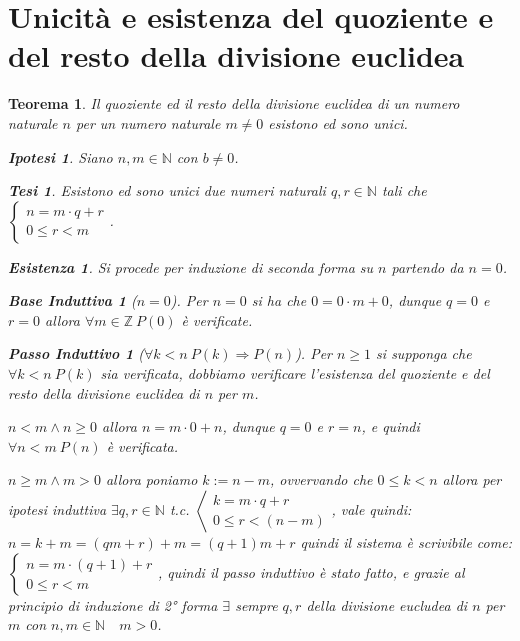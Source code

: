 \documentclass{article}
\makeatletter
\renewenvironment{proof}[1][\proofname]{\par
    \pushQED{\qed}%
    \normalfont \topsep6\p@\@plus6\p@\relax
    \trivlist
    \item\relax
    {\itshape
    #1\@addpunct{.}}\hspace\labelsep\ignorespaces
    }{%
    \popQED\endtrivlist\@endpefalse
}
\newtheorem{theorem}{Teorema}[part]
\newtheorem{ipothesis}[lemma]{Ipotesi}
\newtheorem{thesis}[lemma]{Tesi}
\theoremstyle{definition}
\newtheorem*{existence}{Esistenza}
\newtheorem*{base}{Base Induttiva}
\newtheorem*{step}{Passo Induttivo}
\newcommand{\N}{\mathbb{N}}
\makeatother
\begin{document}
\section{Unicità e esistenza del quoziente e del resto della divisione euclidea}
\begin{theorem}
    Il quoziente ed il resto della divisione euclidea di un numero naturale \(n\) per un numero naturale \(m\neq 0\) esistono ed sono unici.
    \begin{ipothesis}
        Siano \(n,m\in\mathbb{N}\) con \(b\neq 0\).
    \end{ipothesis}
    \begin{thesis}
        Esistono ed sono unici due numeri naturali \(q,r\in\mathbb{N}\) tali che \(\begin{cases} n=m\cdot q+r\\0\leq r<m\end{cases}\).
    \end{thesis}
    \begin{proof}
        \begin{existence}
            Si procede per induzione di seconda forma su \(n\) partendo da \(n=0\).
            \begin{base}[$n=0$]
                Per \(n=0\) si ha che \(0=0\cdot m+0\), dunque \(q=0\) e \(r=0\) allora \(\forall m\in\mathbb{Z}\ P(0)\) è verificate.
            \end{base}
            \begin{step}[$\forall k<n\ P(k)\Rightarrow P(n)$]
                Per \(n\geq1\) si supponga che \(\forall k<n\ P(k)\) sia verificata, dobbiamo verificare l'esistenza del quoziente e del resto della divisione euclidea di \(n\) per \(m\).
                \begin{list}{\leftmargin=1.5em}
                    \item{\(n<m\land n\geq 0\)} allora \(n=m\cdot 0+n\), dunque \(q=0\) e \(r=n\), e quindi \(\forall n<m\ P(n)\) è verificata.
                    \item{\(n\geq m\land m>0\)} allora poniamo \(k:=n-m\), ovvervando che \(0\leq k<n\) allora per ipotesi induttiva \(\exists q,r\in\N\) t.c. \(\left<\begin{aligned}k=m\cdot q+r\\0\leq r<(n-m)\end{aligned}\right.\), vale quindi: \(n=k+m=(qm+r)+m=(q+1)m+r\) quindi il sistema è scrivibile come: \(\begin{cases}n=m\cdot (q+1)+r\\0\leq r<m\end{cases}\), quindi il passo induttivo è stato fatto, e grazie al principio di induzione di 2° forma \(\exists\) sempre \(q,r\) della divisione eucludea di \(n\) per \(m\) con \(n,m\in\N\quad m> 0\).

\end{list}
\end{step}
\end{existence}
\end{proof}
\end{theorem}
\end{document}
